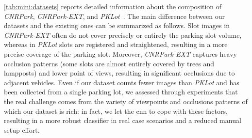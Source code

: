 \ref{tab:mini:datasets} reports detailed information about the composition of \emph{CNRPark}, \emph{CNRPark-EXT}, and \emph{PKLot}~\cite{de2015pklot}.
The main difference between our datasets and the existing ones can be summarized as follows.
Slot images in \emph{CNRPark-EXT} often do not cover precisely or entirely the parking slot volume, whereas in \emph{PKLot} slots are registered and straightened, resulting in a more precise coverage of the parking slot.
Moreover, \emph{CNRPark-EXT} captures heavy occlusion patterns (some slots are almost entirely covered by trees and lampposts) and lower point of views, resulting in significant occlusions due to adjacent vehicles.
Even if our dataset counts fewer images than \emph{PKLot} and has been collected from a single parking lot, we assessed through experiments that the real challenge comes from the variety of viewpoints and occlusions patterns of which our dataset is rich:
in fact, we let the \gls{cnn} to cope with these factors, resulting in a more robust classifier in real case scenarios and a reduced manual setup effort.

